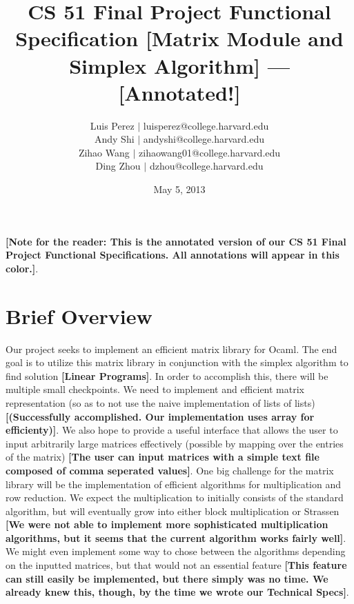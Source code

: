 \documentclass[letterpaper,11pt]{article}
\newcommand{\annot}[1]{\textbf{\color{BrickRed} [#1]}}
\begin{document}
\title{CS 51 Final Project Functional Specification{\annot{Matrix Module and Simplex Algorithm}}
---{\annot{Annotated!}}}
\author{
Luis Perez $|$ luisperez@college.harvard.edu \\ 
Andy Shi $|$ andyshi@college.harvard.edu \\ 
Zihao Wang $|$ zihaowang01@college.harvard.edu \\ 
Ding Zhou $|$ dzhou@college.harvard.edu
}
\date{May 5, 2013}
\maketitle

{\annot{Note for the reader: This is the annotated version of our CS 51 
Final Project Functional Specifications. All annotations will appear in this color.}}.

\section{Brief Overview}

Our project seeks to implement an efficient matrix library for Ocaml. The end
goal is to utilize this matrix library in conjunction with the simplex algorithm
to find solution {\annot{Linear Programs}}. In order to accomplish this,
there will be multiple small checkpoints. We need to implement and efficient
matrix representation (so as to not use the naive implementation of lists of
lists){\annot{(Successfully accomplished. Our implementation uses array for efficienty)}}.
 We also hope to provide a useful interface that allows the user to input
arbitrarily large matrices effectively (possible by mapping over the entries of
the matrix){\annot{The user can input matrices with a simple text file composed of comma
seperated values}}. One big challenge for the matrix library will be the implementation
of efficient algorithms for multiplication and row reduction. We expect the
multiplication to initially consists of the standard algorithm, but will
eventually grow into either block multiplication or Strassen {\annot{We were not
able to implement more sophisticated multiplication algorithms, but it seems that the current
algorithm works fairly well}}. We might even implement some way to chose between the 
algorithms depending on the inputted matrices, but that would not an essential feature 
{\annot{This feature can still easily be implemented, but there simply was no time. We
already knew this, though, by the time we wrote our Technical Specs}}.
\end{document}
